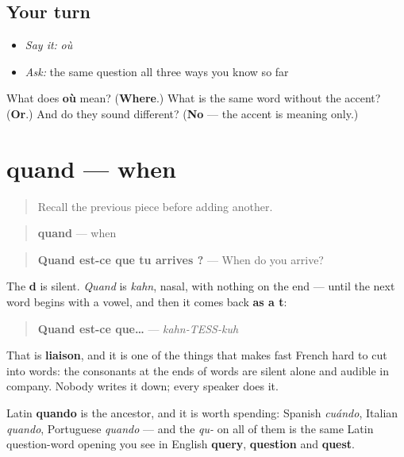 \subsection*{Your turn}
\begin{itemize}
\raggedright
  \item \emph{Say it:} \emph{où}
  \item \emph{Ask:} the same question all three ways you know so far
\end{itemize}

\begin{tcolorbox}[breakable,colback=teal!4,colframe=teal!35!black,title={Before you move on}]
What does \textbf{où} mean? (\textbf{Where}.) What is the same word without the accent? (\textbf{Or}.) And do they sound different? (\textbf{No} — the accent is meaning only.)
\end{tcolorbox}
\section[quand]{quand — when}

\label{lesson:FR-C32-quand}



\begin{quote}
Recall the previous piece before adding another.
\end{quote}

\begin{cousinweb}
\begin{quote}
\textbf{quand} — when
\end{quote}

\begin{quote}
\textbf{Quand est-ce que tu arrives ?} — When do you arrive?
\end{quote}

The \textbf{d} is silent. \emph{Quand} is \emph{kahn}, nasal, with nothing on the end — until the next word begins with a vowel, and then it comes back \textbf{as a t}:

\begin{quote}
\textbf{Quand est-ce que…} — \emph{kahn-TESS-kuh}
\end{quote}

That is \textbf{liaison}, and it is one of the things that makes fast French hard to cut into words: the consonants at the ends of words are silent alone and audible in company. Nobody writes it down; every speaker does it.

Latin \textbf{quando} is the ancestor, and it is worth spending: Spanish \emph{cuándo}, Italian \emph{quando}, Portuguese \emph{quando} — and the \emph{qu-} on all of them is the same Latin question-word opening you see in English \textbf{query}, \textbf{question} and \textbf{quest}.
\end{cousinweb}

